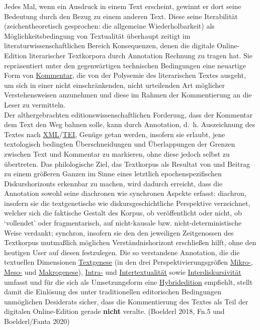 \documentclass{article}
\begin{document}
    Jedes Mal, wenn ein Ausdruck in einem Text erscheint, gewinnt er dort seine Bedeutung durch den Bezug zu einem anderen Text. Diese seine Iterabilität (zeichentheoretisch gesprochen: die allgemeine Wiederholbarkeit) als Möglichkeitsbedingung von Textualität überhaupt zeitigt im literaturwissenschaftlichen Bereich Konsequenzen, denen die digitale Online-Edition literarischer Textkorpora durch Annotation Rechnung zu tragen hat. Sie repräsentiert unter den gegenwärtigen technischen Bedingungen eine neuartige Form von \href{http://gams.uni-graz.at/o:konde.34}{Kommentar}, die von der Polysemie des literarischen Textes ausgeht, um sich in einer nicht einschränkenden, nicht urteilenden Art möglicher Verstehensweisen anzunehmen und diese im Rahmen der Kommentierung an die Leser zu vermitteln. \\
            
        Der althergebrachten editionswissenschaftlichen Forderung, dass der Kommentar dem Text den Weg bahnen solle, kann durch Annotation, d. h. Auszeichnung des Textes nach \href{http://gams.uni-graz.at/o:konde.215}{XML}/\href{http://gams.uni-graz.at/o:konde.178}{TEI}, Genüge getan werden, insofern sie erlaubt, jene textologisch bedingten Überschneidungen und Überlappungen der Grenzen zwischen Text und Kommentar zu markieren, ohne diese jedoch selbst zu übertreten. Das philologische Ziel, das Textkorpus als Resultat von und Beitrag zu einem größeren Ganzen im Sinne eines letztlich epochenspezifischen Diskurshorizonts erkennbar zu machen, wird dadurch erreicht, dass die Annotation sowohl seine diachronen wie synchronen Aspekte erfasst: diachron, insofern sie die textgenetische wie diskursgeschichtliche Perspektive verzeichnet, welcher sich die faktische Gestalt des Korpus, ob veröffentlicht oder nicht, ob ‘vollendet’ oder fragmentarisch, auf nicht-kausale bzw. nicht-deterministische Weise verdankt; synchron, insofern sie den den jeweiligen Zeitgenossen des Textkorpus mutmaßlich möglichen Verständnishorizont erschließen hilft, ohne den heutigen User auf diesen festzulegen. Die so verstandene Annotation, die die textuellen Dimensionen \href{http://gams.uni-graz.at/o:konde.28}{Textgenese} (in den drei Perspektivierungsgrößen \href{http://gams.uni-graz.at/o:konde.26}{Mikro-}, \href{http://gams.uni-graz.at/o:konde.24}{Meso-} und \href{http://gams.uni-graz.at/o:konde.23}{Makrogenese}), \href{http://gams.uni-graz.at/o:konde.21}{Intra-} und \href{http://gams.uni-graz.at/o:konde.20}{Intertextualität} sowie \href{http://gams.uni-graz.at/o:konde.19}{Interdiskursivität} umfasst und für die sich als Umsetzungsform eine \href{http://gams.uni-graz.at/o:konde.96}{Hybridedition} empfiehlt, stellt damit die Einlösung des unter traditionellen editorischen Bedingungen unmöglichen Desiderats sicher, dass die Kommentierung des Textes als Teil der digitalen Online-Edition gerade \textbf{nicht}  veralte. (Boelderl 2018, Fn.5 und Boelderl/Fanta 2020)\\
            
\end{document}
